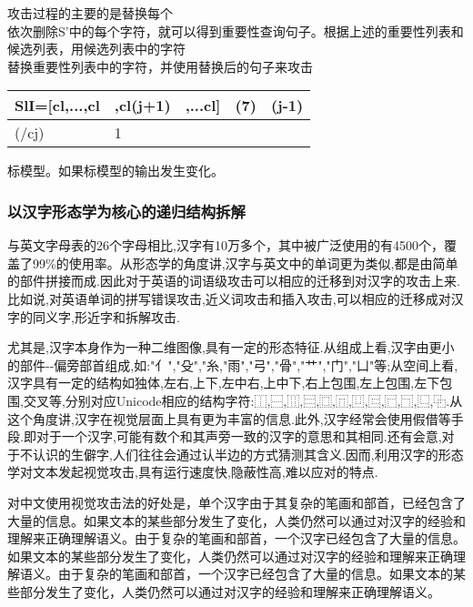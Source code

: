 \documentclass[
]{article}
\begin{document}
攻击过程的主要的是替换每个\\
依次删除S'中的每个字符，就可以得到重要性查询句子。根据上述的重要性列表和候选列表，用候选列表中的字符\\
替换重要性列表中的字符，并使用替换后的句子来攻击

\begin{longtable}[]{@{}lllll@{}}
\toprule
SlI={[}cl,...,cl & ,cl(j+1) & ,...cl{]} & (7) & (j-1) \\
\midrule
\endhead
(/cj) & 1 & & & \\
\bottomrule
\end{longtable}

标模型。如果标模型的输出发生变化。

\hypertarget{ux4ee5ux6c49ux5b57ux5f62ux6001ux5b66ux4e3aux6838ux5fc3ux7684ux9012ux5f52ux7ed3ux6784ux62c6ux89e3}{%
\subsubsection{以汉字形态学为核心的递归结构拆解}\label{ux4ee5ux6c49ux5b57ux5f62ux6001ux5b66ux4e3aux6838ux5fc3ux7684ux9012ux5f52ux7ed3ux6784ux62c6ux89e3}}

与英文字母表的26个字母相比,汉字有10万多个，其中被广泛使用的有4500个，覆盖了99\%的使用率。从形态学的角度讲,汉字与英文中的单词更为类似,都是由简单的部件拼接而成.因此对于英语的词语级攻击可以相应的迁移到对汉字的攻击上来.比如说,对英语单词的拼写错误攻击,近义词攻击和插入攻击,可以相应的迁移成对汉字的同义字,形近字和拆解攻击.

尤其是,汉字本身作为一种二维图像,具有一定的形态特征.从组成上看,汉字由更小的部件-\/-偏旁部首组成,如:"亻","殳","糸,"雨","弓","骨","艹","门","凵"等;从空间上看,汉字具有一定的结构如独体,左右,上下,左中右,上中下,右上包围,左上包围,左下包围,交叉等,分别对应Unicode相应的结构字符:⿰,⿱,⿲,⿳,⿴,⿵,⿶,⿷,⿸,⿹,⿺,⿻.从这个角度讲,汉字在视觉层面上具有更为丰富的信息.此外,汉字经常会使用假借等手段.即对于一个汉字,可能有数个和其声旁一致的汉字的意思和其相同.还有会意,对于不认识的生僻字,人们往往会通过认半边的方式猜测其含义.因而,利用汉字的形态学对文本发起视觉攻击,具有运行速度快,隐蔽性高,难以应对的特点.

对中文使用视觉攻击法的好处是，单个汉字由于其复杂的笔画和部⾸，已经包含了⼤量的信息。如果文本的某些部分发生了变化，⼈类仍然可以通过对汉字的经验和理解来正确理解语义。由于复杂的笔画和部⾸，⼀个汉字已经包含了⼤量的信息。如果文本的某些部分发生了变化，⼈类仍然可以通过对汉字的经验和理解来正确理解语义。由于复杂的笔画和部⾸，⼀个汉字已经包含了⼤量的信息。如果文本的某些部分发生了变化，⼈类仍然可以通过对汉字的经验和理解来正确理解语义。
\end{document}
